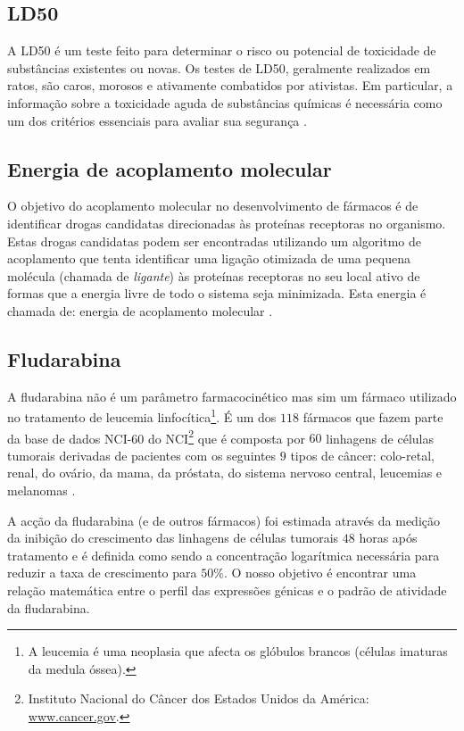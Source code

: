 \subsection{\ac{LD50}}

A \ac{LD50} é um teste feito para determinar o risco ou potencial de toxicidade de substâncias existentes ou novas. 
Os testes de \ac{LD50}, geralmente realizados em ratos, são caros, morosos e ativamente combatidos por ativistas.
Em particular, a informação sobre a toxicidade aguda de substâncias químicas é necessária como um dos critérios essenciais para 
avaliar sua segurança \citep{Devillers2009}.

\subsection{Energia de acoplamento molecular}

O objetivo do acoplamento molecular no desenvolvimento de fármacos é de identificar drogas candidatas direcionadas às proteínas receptoras
no organismo. Estas drogas candidatas podem ser encontradas utilizando um algoritmo de acoplamento que tenta identificar 
uma ligação otimizada de uma pequena molécula (chamada de \emph{ligante}) às proteínas receptoras no seu local ativo de formas 
que a energia livre de todo o sistema seja minimizada. Esta energia é chamada de: energia de acoplamento molecular \citep{Thomsen2007}.

\subsection{Fludarabina}

A fludarabina não é um parâmetro farmacocinético mas sim um fármaco utilizado no tratamento de leucemia linfocítica\footnote{A 
leucemia é uma neoplasia que afecta os glóbulos brancos (células imaturas da medula óssea).}.  
É um dos $118$ fármacos que fazem parte da base de dados NCI-60 do \ac{NCI}\footnote{Instituto Nacional do Câncer dos Estados Unidos da América: 
\url{www.cancer.gov}.} \citep{nci2008} que é composta por $60$ linhagens de células tumorais derivadas 
de pacientes com os seguintes $9$ tipos de câncer: colo-retal, renal, do ovário, da mama, da próstata, do sistema nervoso 
central, leucemias e melanomas \citep{del2007gene}.

A acção da fludarabina (e de outros fármacos) foi estimada através da medição da inibição do crescimento das linhagens de células tumorais
$48$ horas após tratamento e é definida como sendo a concentração logarítmica necessária para reduzir 
a taxa de crescimento para $50\%$. O nosso objetivo é encontrar uma relação matemática entre o perfil das expressões génicas e o padrão 
de atividade da fludarabina.